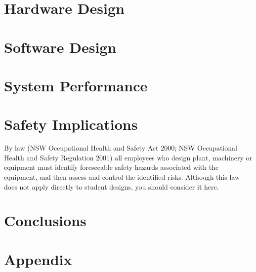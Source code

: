 \documentclass[11pt,a4paper]{article}
\begin{document}
\section{Hardware Design}

\section{Software Design}


\section{System Performance}


\section{Safety Implications}
By law (NSW Occupational Health and Safety Act 2000; NSW Occupational Health and Safety
Regulation 2001) all employees who design plant, machinery or equipment must identify foreseeable safety hazards associated with the equipment, and then assess and control the identified risks. Although this law does not apply directly to student designs, you should consider it here.



\section{Conclusions}

\newpage




\newpage
\section{Appendix}
\end{document}
